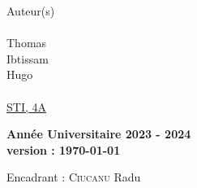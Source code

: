 \documentclass[a4paper, 12pt]{article}
\begin{document}


\begin{titlepage}
\setlength{\headheight}{0cm}
\setlength{\headsep}{0cm}
{

\makelogos

\vspace{4cm}

\begin{center}

\vspace{15mm}

Auteur(s)\\~\\
{\large 
{} Thomas\\
 Ibtissam\\
 Hugo}\\
~\\
\underline{STI, 4A}\\ 

\vspace{3cm}  

\textbf{Année Universitaire 2023 - 2024\\
{\tiny version : \today}}

\vspace{2cm}  

\end{center}
  
\vfill

\begin{flushleft}
	Encadrant : \textsc{Ciucanu} Radu
\end{flushleft}

}
\end{titlepage}
\end{document}
